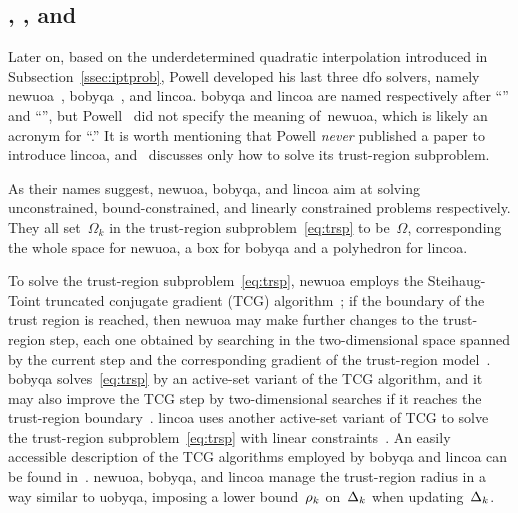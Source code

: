 \documentclass[
    smallextended,  %
    final,          %
]{svjour3}
\newcommand{\fsetm}[1][k]{\Omega_{#1}}
\newcommand{\fset}{\Omega}
\newcommand{\rad}[1][k]{\Delta\ifthenelse{\equal{#1}{}}{}{_{#1}}}
\newcommand{\radlb}[1][k]{\rho\ifthenelse{\equal{#1}{}}{}{_{#1}}}
\begin{document}
\subsection{, , and }
\label{ssec:nbloa}

Later on, based on the underdetermined quadratic interpolation introduced in Subsection~\ref{ssec:iptprob},
Powell developed his last three \gls{dfo} solvers, namely \gls{newuoa}~\cite{Powell_2006,Powell_2008}, \gls{bobyqa}~\cite{Powell_2009}, and \gls{lincoa}.
\gls{bobyqa} and \gls{lincoa} are named respectively after ``'' and
``'', but Powell~\cite{Powell_2006,Powell_2008} did not specify the meaning
of~\gls{newuoa}, which is likely an acronym for ``.''
It is worth mentioning that Powell \emph{never} published a paper to introduce \gls{lincoa},
and~\cite{Powell_2015} discusses only how to solve its trust-region subproblem.

As their names suggest, \gls{newuoa}, \gls{bobyqa}, and \gls{lincoa} aim at solving unconstrained,
bound-constrained, and linearly constrained problems respectively.
They all set~$\fsetm$ in the trust-region subproblem~\eqref{eq:trsp} to be~$\fset$, corresponding the whole space for \gls{newuoa}, a box for \gls{bobyqa} and a polyhedron for \gls{lincoa}.

To solve the trust-region subproblem~\eqref{eq:trsp}, \gls{newuoa} employs the
Steihaug-Toint truncated conjugate gradient (TCG) algorithm~\cite{Steihaug_1983,Toint_1981};
if the boundary of the trust region is reached, then \gls{newuoa} may make further
changes to the trust-region step, each one obtained by searching in the two-dimensional space
spanned by the current step and the corresponding gradient of the trust-region model~\cite[\S~5]{Powell_2006}.
\gls{bobyqa} solves~\eqref{eq:trsp} by an active-set variant of the TCG algorithm, and
it may also improve the TCG step by two-dimensional searches if it reaches the
trust-region boundary~\mbox{\cite[\S~3]{Powell_2009}}.
\gls{lincoa} uses another active-set variant of TCG to solve the trust-region
subproblem~\eqref{eq:trsp} with linear constraints~\cite[\S~3 and \S~5]{Powell_2015}.
An easily accessible description of the TCG algorithms employed by \gls{bobyqa} and \gls{lincoa}
can be found in~\cite[\S~6.2.1 and \S~6.2.2]{Ragonneau_2022}.
\gls{newuoa}, \gls{bobyqa}, and \gls{lincoa} manage the trust-region radius in a way similar to
\gls{uobyqa}, imposing a lower bound~$\radlb$ on~$\rad$ when updating~$\rad$.
\end{document}
